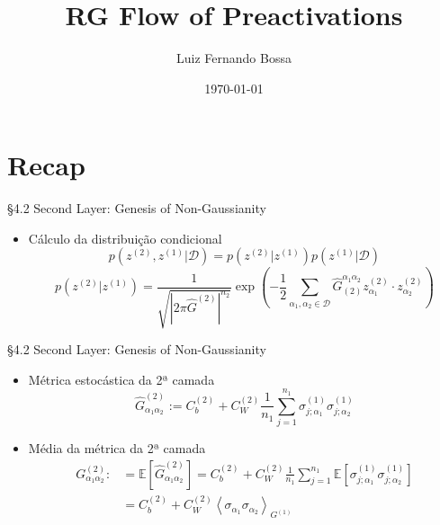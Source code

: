 \documentclass{beamer}
\title{RG Flow of Preactivations}
\author{Luiz Fernando Bossa}
\date{\today}
\institute{Universidade Federal de Santa Catarina}
\newcommand{\EE}{\mathbb{E}}
\newcommand{\Dcal}{\mathcal{D}}
\def\mi#1{{\alpha_{#1}}}
\def\Gchapp#1{\widehat{G}^{(#1)}}
\newcommand{\Gchapeu}[3]{{\Gchapp{#1}_{\mi{#2}\mi{#3}}}}
\newcommand{\Gchapeuinv}[3]{\widehat{G}_{(#1)}^{\mi{#2}\mi{#3}}}
\newcommand{\Gnormal}[3]{{G^{(#1)}_{\mi{#2}\mi{#3}}}}
\newcommand{\Expectation}[2]{\left\langle #1 \right\rangle_{#2}}
\begin{document}
{ 
\frame{\titlepage}}
\frame{\tableofcontents}


\section{Recap}    
\begin{frame}
\tableofcontents[currentsection]
\end{frame}


\begin{frame}{\S 4.2 Second Layer: Genesis of Non-Gaussianity}
	\begin{itemize}
		\item Cálculo da distribuição condicional
		\begin{equation*}\tag{4.32}
			p\left(z^{(2)},z^{(1)}\Big|\Dcal\right) = p\left(z^{(2)}\Big| z^{(1)}\right)p\left(z^{(1)}\Big| \Dcal\right)
		\end{equation*}
		\begin{equation*}\tag{4.35}
			p\left(z^{(2)}\Big| z^{(1)}\right) = \frac{1}{\sqrt{\left|2\pi \hat{G}^{(2)}\right|^{n_2}}}
			\exp\left(-\frac{1}{2} \sum_{\mi1,\mi2\in\Dcal} \Gchapeuinv212 z^{(2)}_{\mi1}\cdot z^{(2)}_{\mi2} \right)
		\end{equation*}
	\end{itemize}
\end{frame}

\begin{frame}{\S 4.2 Second Layer: Genesis of Non-Gaussianity}

\begin{itemize}
	\item 
	Métrica estocástica da 2ª camada
	\begin{equation*}\tag{4.36}
		\Gchapeu212 := C_b^{(2)} + C_W^{(2)}\frac{1}{n_1}\sum_{j=1}^{n_1} \sigma_{j;\mi1}^{(1)}\sigma_{j;\mi2}^{(1)}
	\end{equation*}

	\item Média da métrica da 2ª camada
	\begin{align*}
		\Gnormal212 :&= \EE\left[\Gchapeu212\right] 
		= C_b^{(2)} + C_W^{(2)}\frac{1}{n_1}\sum_{j=1}^{n_1} \EE\left[\sigma_{j;\mi1}^{(1)}\sigma_{j;\mi2}^{(1)}\right]\\
		&= C_b^{(2)} + C_W^{(2)}\Expectation{\sigma_{\mi1}\sigma_{\mi2}}{G^{(1)}}\tag{4.37}
	\end{align*}
\end{itemize}

\end{frame}
\end{document}
